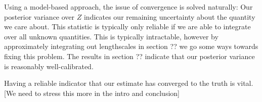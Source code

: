 \documentclass{article}
\begin{document}

Using a model-based approach, the issue of convergence is solved naturally:  Our posterior variance over $Z$ indicates our remaining uncertainty about the quantity we care about.  This statistic is typically only reliable if we are able to integrate over all unknown quantities.  This is typically intractable, however by approximately integrating out lengthscales in section ?? we go some ways towards fixing this problem.  The results in section ?? indicate that our posterior variance is reasonably well-calibrated.

Having a reliable indicator that our estimate has converged to the truth is vital. [We need to stress this more in the intro and conclusion]
\end{document}
